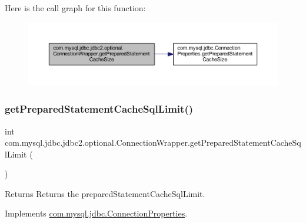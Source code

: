Here is the call graph for this function\+:
\nopagebreak
\begin{figure}[H]
\begin{center}
\leavevmode
\includegraphics[width=350pt]{classcom_1_1mysql_1_1jdbc_1_1jdbc2_1_1optional_1_1_connection_wrapper_ad7e993d7bc7cbf1913a836cdcbbdc0dc_cgraph}
\end{center}
\end{figure}
\mbox{\label{classcom_1_1mysql_1_1jdbc_1_1jdbc2_1_1optional_1_1_connection_wrapper_ac12acf3f17ba3cff3c14bce4eff86c66}} 
\subsubsection{\texorpdfstring{get\+Prepared\+Statement\+Cache\+Sql\+Limit()}{getPreparedStatementCacheSqlLimit()}}
{\footnotesize\ttfamily int com.\+mysql.\+jdbc.\+jdbc2.\+optional.\+Connection\+Wrapper.\+get\+Prepared\+Statement\+Cache\+Sql\+Limit (\begin{DoxyParamCaption}{ }\end{DoxyParamCaption})}

\begin{DoxyReturn}{Returns}
Returns the prepared\+Statement\+Cache\+Sql\+Limit. 
\end{DoxyReturn}


Implements \mbox{\hyperlink{interfacecom_1_1mysql_1_1jdbc_1_1_connection_properties_a4bcee0f0e555dcada01589d7b4168a4e}{com.\+mysql.\+jdbc.\+Connection\+Properties}}.

